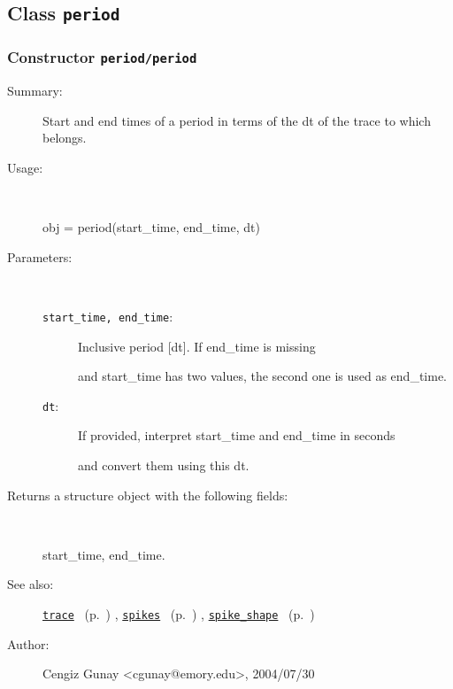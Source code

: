 \subsection{Class \texttt{period}}%
%
\label{ref_period}%
\hypertarget{ref_period}{}%
\subsubsection[Constructor \texttt{period}]{Constructor \texttt{period/period}}%
%
\label{ref_period__period}%
\hypertarget{ref_period__period}{}%
\begin{description}
\item[Summary:]Start and end times of a period in terms of the dt of the trace to which belongs.
%
\item[Usage:]~%
\begin{lyxcode}%
obj = period(start\_time, end\_time, dt)
%
\end{lyxcode}%
%
%
\item[Parameters:]~
\begin{description}%
\item[\texttt{start\_time, end\_time}:]
 Inclusive period [dt]. If end\_time is missing

and start\_time has two values, the second one is used as
end\_time. 
\item[\texttt{dt}:]
 If provided, interpret start\_time and end\_time in seconds

and convert them using this dt.
\end{description}%
%
\item[Returns a structure object with the following fields:
]~

   start\_time, end\_time.
%
%
\item[See also:]%
\hyperlink{ref_trace}{\texttt{trace}}%
\ (p.~\pageref{ref_trace})%
%
, \hyperlink{ref_spikes}{\texttt{spikes}}%
\ (p.~\pageref{ref_spikes})%
%
, \hyperlink{ref_spike_shape}{\texttt{spike\_shape}}%
\ (p.~\pageref{ref_spike_shape})%
%
%
\item[Author:]%
Cengiz Gunay <cgunay@emory.edu>, 2004/07/30
%
\end{description}
\methodline%
